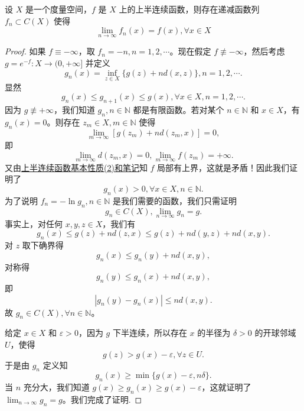 \documentclass[../../main.tex]{subfiles}%
\begin{document}
\begin{theorem}[半连续函数逼近定理]\label{theorem:半连续函数逼近定理}
设 \(X\) 是一个度量空间，\(f\) 是 \(X\) 上的上半连续函数，则存在递减函数列 \(f_{n} \subset C(X)\) 使得
\[
\lim_{n \to \infty} f_{n}(x)=f(x),\forall x \in X
\]
\end{theorem}
\begin{proof}

如果 \(f\equiv -\infty\)，取 \(f_{n}=-n,n = 1,2,\cdots\)。现在假定 \(f\not\equiv -\infty\)，然后考虑 \(g = e^{-f}:X\to(0,+\infty]\) 并定义
\[
g_{n}(x)=\inf_{z\in X}\{g(z)+nd(x,z)\},n = 1,2,\cdots.
\]
显然
\[
g_{n}(x)\leqslant  g_{n + 1}(x)\leqslant  g(x),\forall x\in X,n = 1,2,\cdots.
\]
因为 \(g\not\equiv+\infty\)，我们知道 \(g_{n},n\in\mathbb{N}\) 都是有限函数。若对某个 \(n\in\mathbb{N}\) 和 \(x\in X\)，有 \(g_{n}(x)=0\)。则存在 \(z_{m}\in X,m\in\mathbb{N}\) 使得
\[
\lim_{m\to\infty}[g(z_{m})+nd(z_{m},x)] = 0,
\]
即
\[
\lim_{m\to\infty}d(z_{m},x)=0,\lim_{m\to\infty}f(z_{m})=+\infty.
\]
又由\hyperref[proposition:半连续函数基本性质]{上半连续函数基本性质(2)和笔记}知 \(f\) 局部有上界，这就是矛盾！因此我们证明了
\[
g_{n}(x)>0,\forall x\in X,n\in\mathbb{N}.
\]
为了说明 \(f_{n}=-\ln g_{n},n\in\mathbb{N}\) 是我们需要的函数，我们只需证明
\[
g_{n}\in C(X),\lim_{n\to\infty}g_{n}=g.
\]
事实上，对任何 \(x,y,z\in X\)，我们有
\[
g_{n}(x)\leqslant  g(z)+nd(z,x)\leqslant  g(z)+nd(y,z)+nd(x,y).
\]
对 \(z\) 取下确界得
\[
g_{n}(x)\leqslant  g_{n}(y)+nd(x,y),
\]
对称得
\[
g_{n}(y)\leqslant  g_{n}(x)+nd(x,y),
\]
即
\[
|g_{n}(y)-g_{n}(x)|\leqslant  nd(x,y).
\]
故 \(g_{n}\in C(X),\forall n\in\mathbb{N}\)。

给定 \(x\in X\) 和 \(\varepsilon>0\)，因为 \(g\) 下半连续，所以存在 \(x\) 的半径为 \(\delta>0\) 的开球邻域 \(U\)，使得
\[
g(z)>g(x)-\varepsilon,\forall z\in U.
\]
于是由 \(g_{n}\) 定义知
\[
g_{n}(x)\geqslant \min\{g(x)-\varepsilon,n\delta\}.
\]
当 \(n\) 充分大，我们知道 \(g(x)\geqslant  g_{n}(x)\geqslant  g(x)-\varepsilon\)，这就证明了 \(\lim_{n\to\infty}g_{n}=g\)。我们完成了证明.

\end{proof}
\end{document}
